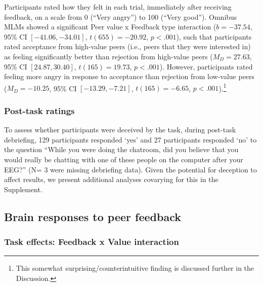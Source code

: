\documentclass[
  man]{apa7}
\begin{document}
Participants rated how they felt in each trial, immediately after receiving feedback, on a scale from 0 (``Very angry'') to 100 (``Very good''). Omnibus MLMs showed a significant Peer value x Feedback type interaction (\(b = -37.54\), 95\% CI \([-41.06, -34.01]\), \(t(655) = -20.92\), \(p < .001\)), such that participants rated acceptance from high-value peers (i.e., peers that they were interested in) as feeling significantly better than rejection from high-value peers (\(M_D = 27.63\), 95\% CI \([24.87, 30.40]\), \(t(165) = 19.73\), \(p < .001\)). However, participants rated feeling more angry in response to acceptance than rejection from low-value peers (\(M_D = -10.25\), 95\% CI \([-13.29, -7.21]\), \(t(165) = -6.65\), \(p < .001\)).\footnote{This somewhat surprising/counterintuitive finding is discussed further in the Discussion.}

\hypertarget{post-task-ratings}{%
\subsubsection{Post-task ratings}\label{post-task-ratings}}

To assess whether participants were deceived by the task, during post-task debriefing, 129 participants responded `yes' and 27 participants responded `no' to the question ``While you were doing the chatroom, did you believe that you would really be chatting with one of these people on the computer after your EEG?'' (N= 3 were missing debriefing data). Given the potential for deception to affect results, we present additional analyses covarying for this in the Supplement.

\hypertarget{brain-responses-to-peer-feedback}{%
\subsection{Brain responses to peer feedback}\label{brain-responses-to-peer-feedback}}

\hypertarget{task-effects-feedback-x-value-interaction}{%
\subsubsection{Task effects: Feedback x Value interaction}\label{task-effects-feedback-x-value-interaction}}
\end{document}

